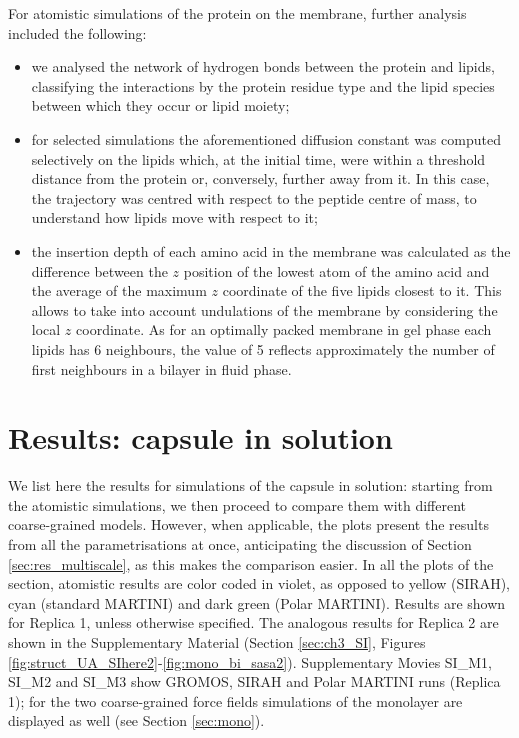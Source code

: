 For atomistic simulations of the protein on the membrane, further analysis included the following:
\begin{itemize}
\item we analysed the network of hydrogen bonds between the protein and lipids, classifying the interactions by the protein residue type and the lipid species between which they occur or lipid moiety;
\item for selected simulations the aforementioned diffusion constant was computed selectively on the lipids which, at the initial time, were within a threshold distance from the protein or, conversely, further away from it. In this case, the trajectory was centred with respect to the peptide centre of mass, to understand how lipids move with respect to it;
\item the insertion depth of each amino acid in the membrane was calculated as the difference between the $z$ position of the lowest atom of the amino acid and the average of the maximum $z$ coordinate of the five lipids closest to it. This allows to take into account undulations of the membrane by considering the local $z$ coordinate. As for an optimally packed membrane in gel phase each lipids has 6 neighbours, the value of 5 reflects approximately the number of first neighbours in a bilayer in fluid phase.
\end{itemize}

\section{Results: capsule in solution} \label{sec:results_cap}
We list here the results for simulations of the capsule in solution: starting from the atomistic simulations, we then proceed to compare them with different coarse-grained models. However, when applicable, the plots present the results from all the parametrisations at once, anticipating the discussion of Section \ref{sec:res_multiscale}, as this makes the comparison easier. In all the plots of the section, atomistic results are color coded in violet, as opposed to yellow (SIRAH), cyan (standard MARTINI) and dark green (Polar MARTINI). Results are shown for Replica 1, unless otherwise specified. The analogous results for Replica 2 are shown in the Supplementary Material (Section \ref{sec:ch3_SI}, Figures \ref{fig:struct_UA_SIhere2}-\ref{fig:mono_bi_sasa2}). Supplementary Movies SI\_M1, SI\_M2 and SI\_M3 show GROMOS, SIRAH and Polar MARTINI runs (Replica 1); for the two coarse-grained force fields simulations of the monolayer are displayed as well (see Section \ref{sec:mono}).

